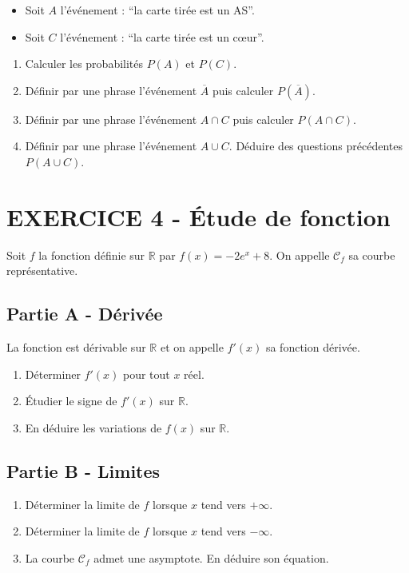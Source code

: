\documentclass[12pt]{article}
\begin{document}
\begin{itemize}
\item Soit $A$ l'événement : ``la carte tirée est un AS''.
\item Soit $C$ l'événement : ``la carte tirée est un cœur''.
\end{itemize}

\begin{enumerate}
\item[1.] Calculer les probabilités $P(A)$ et $P(C)$.
\item[2.] Définir par une phrase l'événement $\overline{A}$ puis calculer $P(\overline{A})$. 
\item[3.] Définir par une phrase l'événement $A \cap C$ puis calculer $P(A \cap C)$. 
\item[4.] Définir par une phrase l'événement $A \cup C$. Déduire des questions précédentes $P(A \cup C)$. 
\end{enumerate}

\newpage
\section*{EXERCICE 4 - Étude de fonction} %

Soit $f$ la fonction définie sur $\mathbb{R}$ par $f(x) = -2e^{x} + 8$. On appelle $\mathcal{C}_f$ sa courbe représentative.

\setlength{\columnseprule}{1pt}
\begin{multicols}{2}

\subsection*{Partie A - Dérivée}

La fonction est dérivable sur $\mathbb{R}$ et on appelle $f'(x)$ sa fonction dérivée.

\begin{enumerate}
\item[1.] Déterminer $f'(x)$ pour tout $x$ réel.
\item[2.] Étudier le signe de $f'(x)$ sur $\mathbb{R}$.
\item[3.] En déduire les variations de $f(x)$ sur $\mathbb{R}$.
\end{enumerate}

\subsection*{Partie B - Limites}

\begin{enumerate}
\item[1.] Déterminer la limite de $f$ lorsque $x$ tend vers $+\infty.$
\item[2.] Déterminer la limite de $f$ lorsque $x$ tend vers $-\infty.$
\item[3.] La courbe $\mathcal{C}_f$ admet une asymptote. En déduire son équation.
\end{enumerate}

\end{multicols}
\end{document}
